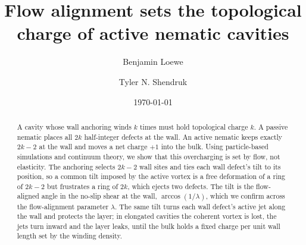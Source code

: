 \documentclass[aps,prl,twocolumn,superscriptaddress,amsmath,amssymb,reprint]{revtex4-2}
\begin{document}
\title{Flow alignment sets the topological charge of active nematic cavities}
\author{Benjamin Loewe}
\author{Tyler N. Shendruk}
\date{\today}

\begin{abstract}
A cavity whose wall anchoring winds $k$ times must hold topological charge $k$. A passive nematic places all $2k$ half-integer defects at the wall. An active
nematic keeps exactly $2k-2$ at the wall and moves a net charge $+1$ into the bulk. Using particle-based simulations and continuum theory, we show that this
overcharging is set by flow, not elasticity. The anchoring selects $2k-2$ wall sites and ties each wall defect's tilt to its position, so a common tilt imposed by
the active vortex is a free deformation of a ring of $2k-2$ but frustrates a ring of $2k$, which ejects two defects. The tilt is the flow-aligned angle in the
no-slip shear at the wall, $\arccos(1/\lambda)$, which we confirm across the flow-alignment parameter $\lambda$. The same tilt turns each wall defect's active jet
along the wall and protects the layer; in elongated cavities the coherent vortex is lost, the jets turn inward and the layer leaks, until the bulk holds a fixed
charge per unit wall length set by the winding density.
\end{abstract}
\maketitle
\end{document}
